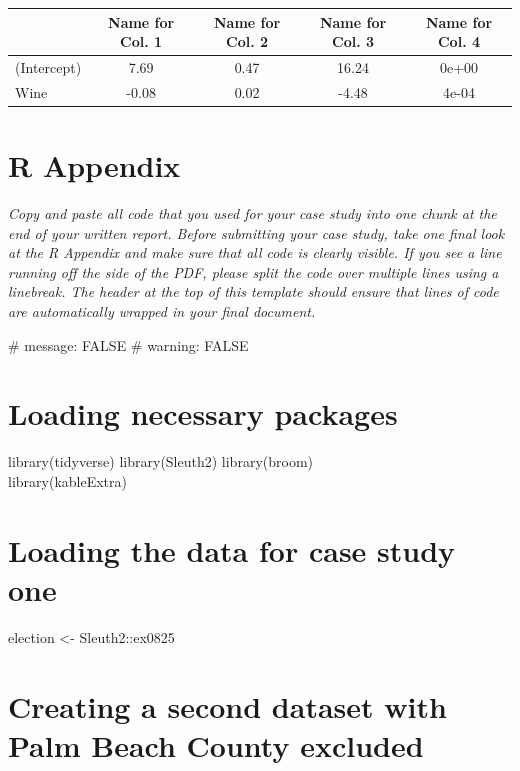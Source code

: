 \documentclass[
  letterpaper,
  DIV=11,
  numbers=noendperiod]{scrartcl}
\begin{document}
\begin{table}[H]
\centering
\begin{tabular}[t]{lcccc}
\toprule
  & Name for Col. 1 & Name for Col. 2 & Name for Col. 3 & Name for Col. 4\\
\midrule
(Intercept) & 7.69 & 0.47 & 16.24 & 0e+00\\
Wine & -0.08 & 0.02 & -4.48 & 4e-04\\
\bottomrule
\end{tabular}
\end{table}

\hypertarget{r-appendix}{%
\section{R Appendix}\label{r-appendix}}

\emph{Copy and paste all code that you used for your case study into one
chunk at the end of your written report. Before submitting your case
study, take one final look at the R Appendix and make sure that all code
is clearly visible. If you see a line running off the side of the PDF,
please split the code over multiple lines using a linebreak. The header
at the top of this template should ensure that lines of code are
automatically wrapped in your final document.}

\#\textbar{} message: FALSE \#\textbar{} warning: FALSE

\hypertarget{loading-necessary-packages}{%
\section{Loading necessary packages}\label{loading-necessary-packages}}

library(tidyverse) library(Sleuth2) library(broom)\\
library(kableExtra)

\hypertarget{loading-the-data-for-case-study-one}{%
\section{Loading the data for case study
one}\label{loading-the-data-for-case-study-one}}

election \textless- Sleuth2::ex0825

\hypertarget{creating-a-second-dataset-with-palm-beach-county-excluded}{%
\section{Creating a second dataset with Palm Beach County
excluded}\label{creating-a-second-dataset-with-palm-beach-county-excluded}}
\end{document}

